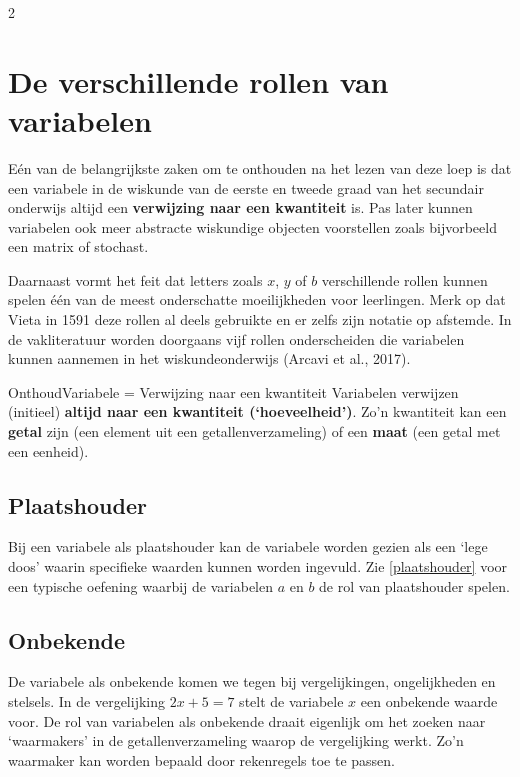 \begin{multicols}{2}
\section{De verschillende rollen van variabelen}
Eén van de belangrijkste zaken om te onthouden na het lezen van deze loep is dat een variabele in de wiskunde van de eerste en tweede graad van het secundair onderwijs altijd een \textbf{verwijzing naar een kwantiteit} is. Pas later kunnen variabelen ook meer abstracte wiskundige objecten voorstellen zoals bijvorbeeld een matrix of stochast.

Daarnaast vormt het feit dat letters zoals $x$, $y$ of $b$ verschillende rollen kunnen spelen één van de meest onderschatte moeilijkheden voor leerlingen. Merk op dat Vieta in 1591 deze rollen al deels gebruikte en er zelfs zijn notatie op afstemde. In de vakliteratuur worden doorgaans vijf rollen onderscheiden die variabelen kunnen aannemen in het wiskundeonderwijs (Arcavi et al., 2017).

\begin{kader}{Onthoud}{Variabele = Verwijzing naar een kwantiteit}
Variabelen verwijzen (initieel) \textbf{altijd naar een kwantiteit (`hoeveelheid')}. Zo'n kwantiteit kan een \textbf{getal} zijn (een element uit een getallenverzameling) of een \textbf{maat} (een getal met een eenheid).\end{kader}
\subsection{Plaatshouder}
Bij een variabele als plaatshouder kan de variabele worden gezien als een ‘lege doos’ waarin specifieke waarden kunnen worden ingevuld. Zie \autoref{plaatshouder} voor een typische oefening waarbij de variabelen $a$ en $b$ de rol van plaatshouder spelen.

\subsection{Onbekende}
De variabele als onbekende komen we tegen bij vergelijkingen, ongelijkheden en stelsels. In de vergelijking $2x + 5 = 7$ stelt de variabele $x$ een onbekende waarde voor. De rol van variabelen als onbekende draait eigenlijk om het zoeken naar ‘waarmakers’ in de getallenverzameling waarop de vergelijking werkt. Zo'n waarmaker kan worden bepaald door rekenregels toe te passen.


\end{multicols}
